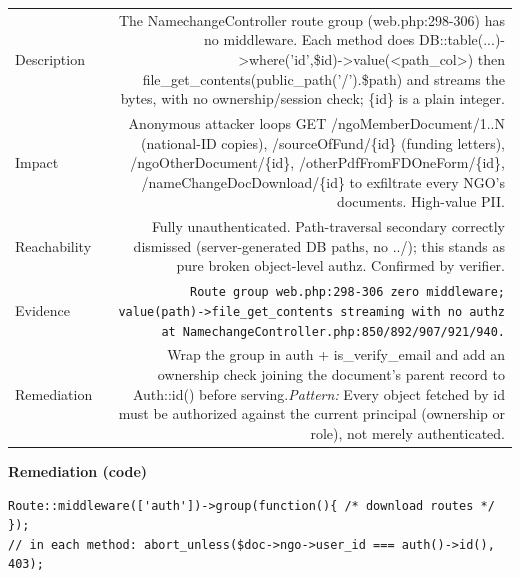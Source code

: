 \documentclass[11pt,a4paper]{article}
\begin{document}
{\renewcommand{\arraystretch}{1.35}%
\begin{tabularx}{\textwidth}{L R}
\toprule
Description & The NamechangeController route group (web.php:298-306) has no middleware. Each method does DB::table(...)-\textgreater{}where('id',\$id)-\textgreater{}value(\textless{}path\_col\textgreater{}) then file\_get\_contents(public\_path('/').\$path) and streams the bytes, with no ownership/session check; \{id\} is a plain integer. \\
Impact & Anonymous attacker loops GET /ngoMemberDocument/1..N (national-ID copies), /sourceOfFund/\{id\} (funding letters), /ngoOtherDocument/\{id\}, /otherPdfFromFDOneForm/\{id\}, /nameChangeDocDownload/\{id\} to exfiltrate every NGO's documents. High-value PII. \\
Reachability & Fully unauthenticated. Path-traversal secondary correctly dismissed (server-generated DB paths, no ../); this stands as pure broken object-level authz. Confirmed by verifier. \\
Evidence & \texttt{\small Route group web.php:298-306 zero middleware; value(path)-\textgreater{}file\_get\_contents streaming with no authz at NamechangeController.php:850/892/907/921/940.} \\
Remediation & Wrap the group in auth + is\_verify\_email and add an ownership check joining the document's parent record to Auth::id() before serving.\newline\emph{Pattern:} Every object fetched by id must be authorized against the current principal (ownership or role), not merely authenticated. \\
\bottomrule
\end{tabularx}}

\vspace{4pt}\noindent\textbf{Remediation (code)}\par
\begin{lstlisting}
Route::middleware(['auth'])->group(function(){ /* download routes */ });
// in each method: abort_unless($doc->ngo->user_id === auth()->id(), 403);
\end{lstlisting}
\end{document}
